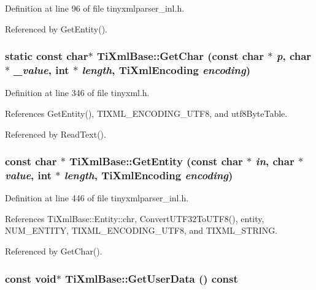 Definition at line 96 of file tinyxmlparser\_\-inl.h.

Referenced by GetEntity().\hypertarget{class_ti_xml_base_a5b0fde72d6f662ae1fd6303195d2159b}{
\subsubsection[{GetChar}]{\setlength{\rightskip}{0pt plus 5cm}static const char$\ast$ TiXmlBase::GetChar (const char $\ast$ {\em p}, \/  char $\ast$ {\em \_\-value}, \/  int $\ast$ {\em length}, \/  {\bf TiXmlEncoding} {\em encoding})}}
\label{class_ti_xml_base_a5b0fde72d6f662ae1fd6303195d2159b}


Definition at line 346 of file tinyxml.h.

References GetEntity(), TIXML\_\-ENCODING\_\-UTF8, and utf8ByteTable.

Referenced by ReadText().\hypertarget{class_ti_xml_base_ac5c08bf3deffcda0bf8ce2958372b584}{
\subsubsection[{GetEntity}]{\setlength{\rightskip}{0pt plus 5cm}const char $\ast$ TiXmlBase::GetEntity (const char $\ast$ {\em in}, \/  char $\ast$ {\em value}, \/  int $\ast$ {\em length}, \/  {\bf TiXmlEncoding} {\em encoding})}}
\label{class_ti_xml_base_ac5c08bf3deffcda0bf8ce2958372b584}


Definition at line 446 of file tinyxmlparser\_\-inl.h.

References TiXmlBase::Entity::chr, ConvertUTF32ToUTF8(), entity, NUM\_\-ENTITY, TIXML\_\-ENCODING\_\-UTF8, and TIXML\_\-STRING.

Referenced by GetChar().\hypertarget{class_ti_xml_base_ad0120210e4680ef2088601753ce0ede4}{
\subsubsection[{GetUserData}]{\setlength{\rightskip}{0pt plus 5cm}const void$\ast$ TiXmlBase::GetUserData () const}}
\label{class_ti_xml_base_ad0120210e4680ef2088601753ce0ede4}


